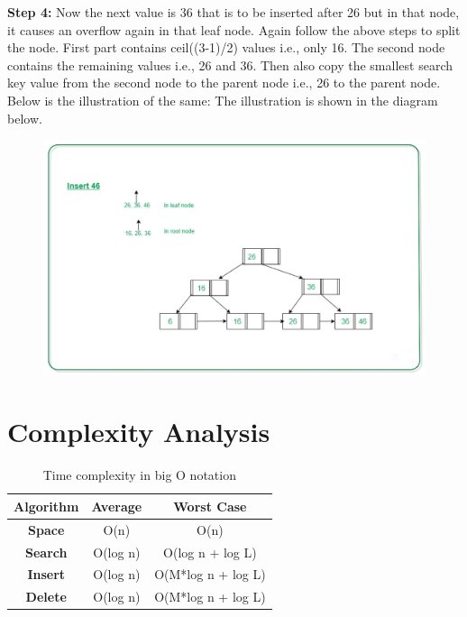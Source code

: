 \documentclass[11pt, a4paper]{article}
\begin{document}
\noindent \textbf{Step 4:} Now the next value is 36 that is to be inserted after 26 but in that node, it causes an overflow again in that leaf node. Again follow the above steps to split the node. First part contains ceil((3-1)/2) values i.e., only 16. The second node contains the remaining values i.e., 26 and 36. Then also copy the smallest search key value from the second node to the parent node i.e., 26 to the parent node. Below is the illustration of the same:
The illustration is shown in the diagram below.

\begin{figure}[h]
    \centering
    \includegraphics[scale=0.3]{in6.jpeg}
    \label{in6}
\end{figure}

\section{Complexity Analysis}
\begin{table}[h]
    \centering
    \caption{Time complexity in big O notation} \vspace{.2cm}
    \begin{tabular}{| c | c | c |}
    \hline
    \textbf{Algorithm} & \textbf{Average} & \textbf{Worst Case}\\
    \hline
    \textbf{Space} & O(n) & O(n) \\
    \hline
    \textbf{Search} & O(log n) & O(log n + log L) \\
    \hline
    \textbf{Insert} & O(log n) & O(M*log n + log L) \\
    \hline
    \textbf{Delete} & O(log n) & O(M*log n + log L)\\
    \hline
    \end{tabular}
    
    \label{tab:complexity}
\end{table}
\end{document}
